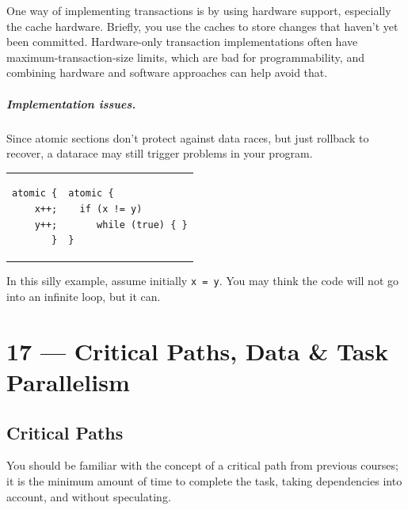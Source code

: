 \documentclass[a4paper]{report}
\begin{document}
One way of implementing transactions is by using hardware support,
especially the cache hardware. Briefly, you use the caches to store
changes that haven't yet been committed. Hardware-only transaction
implementations often have maximum-transaction-size limits, which are
bad for programmability, and combining hardware and software approaches
can help avoid that.

\paragraph{Implementation issues.} Since atomic sections don't protect
against data races, but just rollback to recover, a datarace may still
trigger problems in your program.

\begin{tabular}{r|l}
\hspace*{2em}  \begin{minipage}{.4\textwidth}
\begin{lstlisting}
atomic {
  x++;
  y++;
}
\end{lstlisting}
\end{minipage}
&
\hspace*{2em} \begin{minipage}{.4\textwidth}
\begin{lstlisting}
atomic {
  if (x != y)
     while (true) { }
}
\end{lstlisting}
\end{minipage}
\end{tabular}

In this silly example, assume initially {\tt x = y}. You may think the
code will not go into an infinite loop, but it can.










\chapter*{17 --- Critical Paths, Data \& Task Parallelism}


\section*{Critical Paths}
You should be familiar with the concept of a critical path from previous
courses; it is the minimum amount of time to complete the task, taking
dependencies into account, and without speculating.
\end{document}
